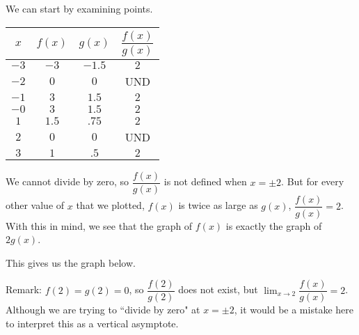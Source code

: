 \begin{solution}
We can start by examining points.
\begin{center}
\begin{tabular}{c|c|c|c}
$x$&$f(x)$&$g(x)$&$\dfrac{f(x)}{g(x)}$\\
 \hline
 $-3$&$-3$&$-1.5$&$2$\\
 \hline
 $-2$&$0$&$0$&UND\\
 \hline
 $-1$&$3$&$1.5$&$2$\\
  \hline
 $-0$&$3$&$1.5$&$2$\\
 \hline
 $1$&$1.5$&$.75$&$2$\\
 \hline
 $2$&$0$&$0$&UND\\
 \hline
 $3$&$1$&$.5$&$2$
\end{tabular}\end{center}

We cannot divide by zero, so $\dfrac{f(x)}{g(x)}$ is not defined when $x=\pm2$. But for every other value of $x$ that we plotted, $f(x)$ is twice as large as $g(x)$, $\dfrac{f(x)}{g(x)}=2$. With this in mind, we see that the graph of $f(x)$ is exactly the graph of $2g(x)$.

This gives us the graph below.
\begin{center}
\end{center}
Remark:  $f(2)=g(2)=0$, so $\dfrac{f(2)}{g(2)}$ does not exist, but $\displaystyle\lim_{x \rightarrow 2}\dfrac{f(x)}{g(x)}=2$. Although we are trying to ``divide by zero" at $x=\pm 2$, it would be a mistake here to interpret this as a vertical asymptote.
\end{solution}


